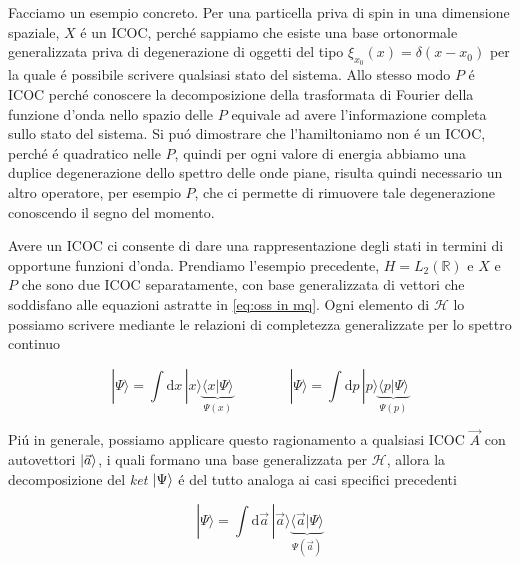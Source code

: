 Facciamo un esempio concreto. Per una particella priva di spin in una dimensione spaziale, $X$ \'e un ICOC,
perch\'e sappiamo che esiste una base ortonormale generalizzata priva di degenerazione di oggetti del tipo $\xi_{x_0}(x) = \delta(x-x_0)$ per la quale \'e possibile scrivere qualsiasi stato del sistema. Allo stesso modo $P$ \'e ICOC perch\'e conoscere la decomposizione della trasformata di Fourier della funzione d'onda nello spazio delle $P$ equivale ad avere l'informazione completa sullo stato del sistema. Si pu\'o dimostrare che l'hamiltoniamo non \'e un ICOC, perch\'e \'e quadratico nelle $P$, quindi per ogni valore di energia abbiamo una duplice degenerazione dello spettro delle onde piane, risulta quindi necessario un altro operatore, per esempio $P$, che ci permette di rimuovere tale degenerazione conoscendo il segno del momento.

Avere un ICOC ci consente di dare una rappresentazione degli stati in termini di opportune funzioni d'onda. Prendiamo l'esempio precedente, $H = L_2(\mathbb{R})$ e $X$ e $P$ che sono due ICOC separatamente, con base generalizzata di vettori che soddisfano alle equazioni astratte in \ref{eq:oss in mq}. Ogni elemento di $\mathcal{H}$ lo possiamo scrivere mediante le relazioni di completezza generalizzate per lo spettro continuo

$$|\Psi\rangle=\int\mathrm{d}x\,|x\rangle\underbrace{\langle x|\Psi\rangle}_{\Psi(x)}\qquad\qquad|\Psi\rangle=\int\mathrm{d}p\,|p\rangle\underbrace{\langle p|\Psi\rangle}_{\Psi(p)}$$

Pi\'u in generale, possiamo applicare questo ragionamento a qualsiasi ICOC $\vec{A}$ con autovettori $\ket{\vec{a}}$, i quali formano una base generalizzata per $\mathcal{H}$, allora la decomposizione del \textit{ket} $\ket{\Psi}$ \'e del tutto analoga ai casi specifici precedenti

$$|\Psi\rangle=\int\mathrm{d}\vec{a}\,|\vec{a}\rangle\underbrace{\langle\vec{a}|\Psi\rangle}_{\Psi(\vec{a})}$$
